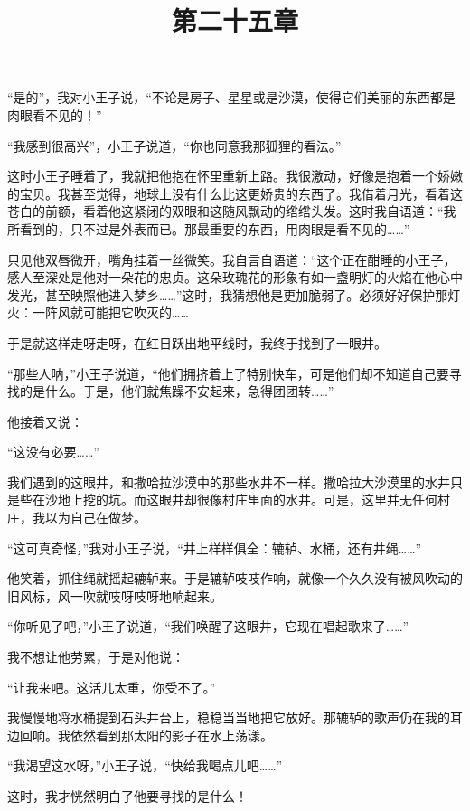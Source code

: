 “是的”，我对小王子说，“不论是房子、星星或是沙漠，使得它们美丽的东西都是肉眼看不见的！”

“我感到很高兴”，小王子说道，“你也同意我那狐狸的看法。”

这时小王子睡着了，我就把他抱在怀里重新上路。我很激动，好像是抱着一个娇嫩的宝贝。我甚至觉得，地球上没有什么比这更娇贵的东西了。我借着月光，看着这苍白的前额，看着他这紧闭的双眼和这随风飘动的绺绺头发。这时我自语道：“我所看到的，只不过是外表而已。那最重要的东西，用肉眼是看不见的\ldots{}\ldots{}”

只见他双唇微开，嘴角挂着一丝微笑。我自言自语道：“这个正在酣睡的小王子，感人至深处是他对一朵花的忠贞。这朵玫瑰花的形象有如一盏明灯的火焰在他心中发光，甚至映照他进入梦乡\ldots{}\ldots{}”这时，我猜想他是更加脆弱了。必须好好保护那灯火：一阵风就可能把它吹灭的\ldots{}\ldots{}

于是就这样走呀走呀，在红日跃出地平线时，我终于找到了一眼井。

\title{第二十五章}

“那些人呐，”小王子说道，“他们拥挤着上了特别快车，可是他们却不知道自己要寻找的是什么。于是，他们就焦躁不安起来，急得团团转\ldots{}\ldots{}”

他接着又说：

“这没有必要\ldots{}\ldots{}”

我们遇到的这眼井，和撒哈拉沙漠中的那些水井不一样。撒哈拉大沙漠里的水井只是些在沙地上挖的坑。而这眼井却很像村庄里面的水井。可是，这里并无任何村庄，我以为自己在做梦。

“这可真奇怪，”我对小王子说，“井上样样俱全：辘轳、水桶，还有井绳\ldots{}\ldots{}”

他笑着，抓住绳就摇起辘轳来。于是辘轳吱吱作响，就像一个久久没有被风吹动的旧风标，风一吹就吱呀吱呀地响起来。

“你听见了吧，”小王子说道，“我们唤醒了这眼井，它现在唱起歌来了\ldots{}\ldots{}”

我不想让他劳累，于是对他说：

“让我来吧。这活儿太重，你受不了。”

我慢慢地将水桶提到石头井台上，稳稳当当地把它放好。那辘轳的歌声仍在我的耳边回响。我依然看到那太阳的影子在水上荡漾。

{\startalignment[center]
 \stopalignment}

“我渴望这水呀，”小王子说，“快给我喝点儿吧\ldots{}\ldots{}”

这时，我才恍然明白了他要寻找的是什么！

